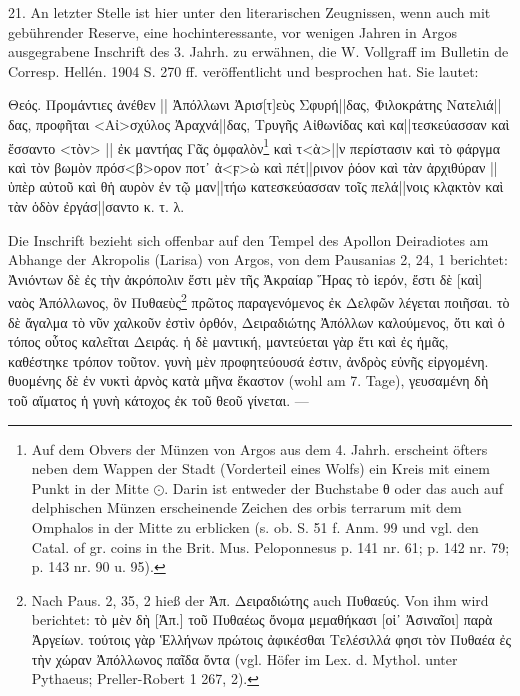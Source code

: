 \documentclass[a4paper, 11pt, oneside]{article}
\begin{document}
21. An letzter Stelle ist hier unter den literarischen Zeugnissen, wenn auch mit gebührender Reserve, eine hochinteressante, vor wenigen Jahren in Argos ausgegrabene Inschrift des 3. Jahrh. zu erwähnen, die W. Vollgraff im Bulletin de Corresp. Hellén. 1904 S. 270 ff. veröffentlicht und besprochen hat. Sie lautet:

Θεός. Προμάντιες ἀνέθεν || Ἀπόλλωνι Ἀρισ[τ]εὺς Σφυρή||δας, Φιλοκράτης Νατελιά||δας, προφῆται <Αἰ>σχύλος Ἀραχνά||δας, Τρυγῆς Αἰθωνίδας καὶ κα||τεσκεύασσαν καὶ ἕσσαντο <τὸν> || ἐκ μαντήας Γᾶς ὀμφαλὸν\footnote{Auf dem Obvers der Münzen von Argos aus dem 4. Jahrh. erscheint öfters neben dem Wappen der Stadt (Vorderteil eines Wolfs) ein Kreis mit einem Punkt in der Mitte $\odot$. Darin ist entweder der Buchstabe θ oder das auch auf delphischen Münzen erscheinende Zeichen des orbis terrarum mit dem Omphalos in der Mitte zu erblicken (s. ob. S. 51 f. Anm. 99 und vgl. den Catal. of gr. coins in the Brit. Mus. Peloponnesus p. 141 nr. 61; p. 142 nr. 79; p. 143 nr. 90 u. 95).} καὶ τ<ὰ>||ν περίστασιν καὶ τὸ φάργμα καὶ τὸν βωμὸν πρόσ<β>ορον ποτ᾽ ἀ<ϝ>ὼ καὶ πέτ||ρινον ῥόον καὶ τὰν ἀρχιθύραν || ὑπὲρ αὐτοῦ καὶ θἡ αυρὸν ἐν τῷ μαν||τήω κατεσκεύασσαν τοῖς πελά||νοις κλᾳκτὸν καὶ τὰν ὁδὸν ἐργάσ||σαντο κ. τ. λ.

Die Inschrift bezieht sich offenbar auf den Tempel des Apollon Deiradiotes am Abhange der Akropolis (Larisa) von Argos, von dem Pausanias 2, 24, 1 berichtet: Ἀνιόντων δὲ ἐς τὴν ἀκρόπολιν ἔστι μὲν τῆς Ἀκραίαρ Ἥρας τὸ ἱερόν, ἔστι δὲ [καὶ] ναὸς Ἀπόλλωνος, ὃν Πυθαεὺς\footnote{Nach Paus. 2, 35, 2 hieß der Ἀπ. Δειραδιώτης auch Πυθαεύς. Von ihm wird berichtet: τὸ μὲν δὴ [Ἀπ.] τοῦ Πυθαέως ὄνομα μεμαθήκασι [οἱ᾽ Ἀσιναῖοι] παρὰ Ἀργείων. τούτοις γὰρ Ἑλλήνων πρώτοις ἀφικέσθαι Τελέσιλλά φησι τὸν Πυθαέα ἐς τὴν χώραν Ἀπόλλωνος παῖδα ὄντα (vgl. Höfer im Lex. d. Mythol. unter Pythaeus; Preller-Robert 1 267, 2).} πρῶτος παραγενόμενος ἐκ Δελφῶν λέγεται ποιῆσαι. τὸ δὲ ἄγαλμα τὸ νῦν χαλκοῦν ἐστὶν ὀρθόν, Δειραδιώτης Ἀπόλλων καλούμενος, ὅτι καὶ ὁ τόπος οὗτος καλεῖται Δειράς. ἡ δὲ μαντική, μαντεύεται γὰρ ἔτι καὶ ἐς ἡμᾶς, καθέστηκε τρόπον τοῦτον. γυνὴ μὲν προφητεύουσά ἐστιν, ἀνδρὸς εὐνῆς εἰργομένη. θυομένης δὲ ἐν νυκτὶ ἀρνὸς κατὰ μῆνα ἕκαστον (wohl am 7. Tage), γευσαμένη δὴ τοῦ αἵματος ἡ γυνὴ κάτοχος ἐκ τοῦ θεοῦ γίνεται. ---
\end{document}

